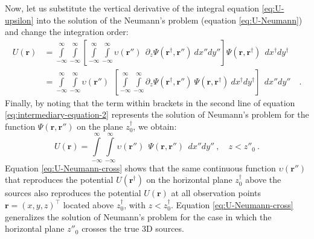 Now, let us substitute the vertical derivative of the integral equation \ref{eq:U-upsilon}
into the solution of the Neumann's problem (equation \ref{eq:U-Neumann}) and change the
integration order:
\begin{equation}
	\begin{split}
		U(\mathbf{r}) 
		&= \int\limits_{-\infty}^{\infty} \int\limits_{-\infty}^{\infty}
		\left[ 
		\int\limits_{-\infty}^{\infty} \int\limits_{-\infty}^{\infty}
		\upsilon(\mathbf{r}'') \:\: 
		\partial_{z} \Psi(\mathbf{r}^{\dagger}, \mathbf{r}'') 
		\: dx''dy'' \right]
		\Psi(\mathbf{r}, \mathbf{r}^{\dagger}) 
		\:\: dx^{\dagger}dy^{\dagger} \\
		&= 
		\int\limits_{-\infty}^{\infty} \int\limits_{-\infty}^{\infty}
		\upsilon(\mathbf{r}'') \:\:
		\left[ 
		\int\limits_{-\infty}^{\infty} \int\limits_{-\infty}^{\infty}
		\partial_{z} \Psi(\mathbf{r}^{\dagger}, \mathbf{r}'')
		\: \Psi(\mathbf{r}, \mathbf{r}^{\dagger}) 
		\: dx^{\dagger}dy^{\dagger} \right]
		\:\: dx''dy'' \quad .
	\end{split}
\label{eq:intermediary-equation-2}
\end{equation}
Finally, by noting that the term within brackets in the second line of equation
\ref{eq:intermediary-equation-2} represents the solution of Neumann's problem
for the function $\Psi(\mathbf{r}, \mathbf{r}'')$ on the plane
$z^{\dagger}_{0}$, we obtain:
\begin{equation}
U(\mathbf{r}) =  
\int\limits_{-\infty}^{\infty} \int\limits_{-\infty}^{\infty}
\upsilon(\mathbf{r}'') \:\: 
\Psi(\mathbf{r}, \mathbf{r}'') 
\:\: dx''dy'' \: , \quad z < z''_{0} \: .
\label{eq:U-Neumann-cross}
\end{equation}
Equation \ref{eq:U-Neumann-cross} shows that the same continuous function
$\upsilon(\mathbf{r}'')$ that reproduces the potential $U(\mathbf{r}^{\dagger})$ on 
the horizontal plane $z^{\dagger}_{0}$ above the sources 
also reproduces the potential $U(\mathbf{r})$ at all
observation points $\mathbf{r} = (x, y, z)^{\top}$ located above $z^{\dagger}_{0}$, 
with $z < z^{\dagger}_{0}$.
Equation \ref{eq:U-Neumann-cross} generalizes the solution of Neumann's problem
for the case in which the horizontal plane $z''_{0}$ crosses the true 3D sources.
